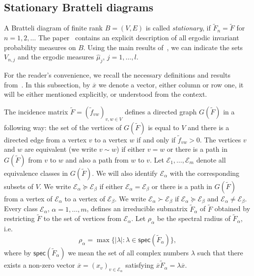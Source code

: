 \documentclass[11pt, english, reqno]{amsart}
\theoremstyle{definition}
\theoremstyle{remark}
\theoremstyle{plain}
\def\ov{\overline}
\def\tl{\widetilde}
\def\wh{\widehat}
\numberwithin{equation}{section}
\begin{document}
{\subsection{Stationary Bratteli diagrams}
A Bratteli diagram of finite rank $B = (V,E)$ is called \textit{stationary},
if $\tl F_n = \tl F$ for $n = 1,2,\ldots$ The paper~\cite{BezuglyiKwiatkowskiMedynetsSolomyak2010} contains an explicit
description of all ergodic invariant probability measures on $B$. Using the
main results of~\cite{BezuglyiKwiatkowskiMedynetsSolomyak2010}, we can
indicate the sets $V_{n,j}$ and the ergodic measures $\wh{\mu}_j$, $j = 1,
\ldots,l$.

 For the reader's convenience, we recall the necessary definitions
and results from~\cite{BezuglyiKwiatkowskiMedynetsSolomyak2010}. In this
subsection, by $\ov x$ we denote a  vector, either column or row one, it will
be either mentioned explicitly, or understood from the context.

The incidence matrix $\tl F = (\tl f_{vw})_{v,w \in V}$ defines a directed
graph $G(\tl F)$ in a following way: the set of the vertices of $G(\tl F)$ is
equal to $V$ and there is a directed edge from a vertex $v$ to a vertex $w$
if and only if $\tl f_{vw} > 0$. The vertices $v$ and $w$ are equivalent (we
write $v \sim w$) if either $v = w$ or there is a path in $G(\tl F)$ from $v$
to $w$ and also a path from $w$ to $v$. Let $\mathcal{E}_1,\ldots,
\mathcal{E}_m$ denote all equivalence classes in $G(\tl F)$. We will also
identify $\mathcal{E}_{\alpha}$ with the corresponding subsets of $V$. We
write $\mathcal{E}_{\alpha} \succeq \mathcal{E}_{\beta}$ if either
$\mathcal{E}_{\alpha} = \mathcal{E}_{\beta}$ or there is a path in
$G(\tl F)$ from a vertex of $\mathcal{E}_{\alpha}$ to a vertex of
$\mathcal{E}_{\beta}$. We write $\mathcal{E}_{\alpha} \succ
\mathcal{E}_{\beta}$ if $\mathcal{E}_{\alpha} \succeq
\mathcal{E}_{\beta}$ and $\mathcal{E}_{\alpha} \neq
\mathcal{E}_{\beta}$. Every class $\mathcal{E}_{\alpha}$, $\alpha = 1,
\ldots,m$, defines an irreducible submatrix $\tl F_{\alpha}$ of $\tl F$
obtained by restricting $\tl F$ to the set of vertices from
$\mathcal{E}_{\alpha}$. Let $\rho_{\alpha}$ be the spectral radius of
$\tl F_{\alpha}$, i.e.
$$
\rho_{\alpha} = \max\{|\lambda|: \lambda \in
\mathsf{spec}(\tl F_{\alpha})\},
$$
where by $\mathsf{spec}(\tl F_{\alpha})$ we mean the set of all complex
numbers $\lambda$ such that there exists a non-zero vector $\ov x =
(x_v)_{v \in \mathcal{E}_{\alpha}}$ satisfying $\ov x \tl{F}_{\alpha} =
\lambda \overline x$.

}
\end{document}
